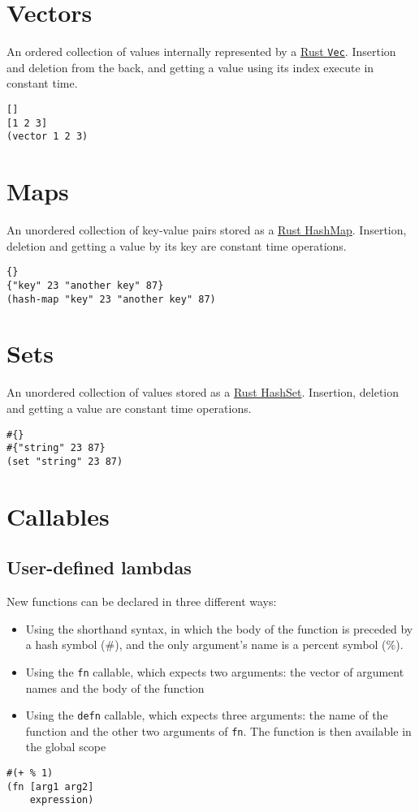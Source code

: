 \documentclass[11pt]{scrreprt}
\begin{document}
\section{Vectors}
An ordered collection of values internally represented by a \href{https://doc.rust-lang.org/std/vec/struct.Vec.html}{Rust \texttt{Vec}}. Insertion and deletion from the back, and getting a value using its index execute in constant time.
\begin{verbatim}
[]
[1 2 3]
(vector 1 2 3)
\end{verbatim}

\section{Maps}
An unordered collection of key-value pairs stored as a \href{https://doc.rust-lang.org/std/collections/struct.HashMap.html}{Rust HashMap}. Insertion, deletion and getting a value by its key are constant time operations.
\begin{verbatim}
{}
{"key" 23 "another key" 87}
(hash-map "key" 23 "another key" 87)
\end{verbatim}

\section{Sets}
An unordered collection of values stored as a \href{https://doc.rust-lang.org/std/collections/struct.HashSet.html}{Rust HashSet}. Insertion, deletion and getting a value are constant time operations.
\begin{verbatim}
#{}
#{"string" 23 87}
(set "string" 23 87)
\end{verbatim}

\section{Callables}
\subsection{User-defined lambdas}
\label{Lambdas}
New functions can be declared in three different ways:
\begin{itemize}
    \item Using the shorthand syntax, in which the body of the function is preceded by a hash symbol (\#), and the only argument's name is a percent symbol (\%).
    \item Using the \texttt{fn} callable, which expects two arguments: the vector of argument names and the body of the function
    \item Using the \texttt{defn} callable, which expects three arguments: the name of the function and the other two arguments of \texttt{fn}. The function is then available in the global scope
\end{itemize}
\begin{verbatim}
#(+ % 1)
(fn [arg1 arg2]
    expression)
\end{verbatim}
\end{document}
